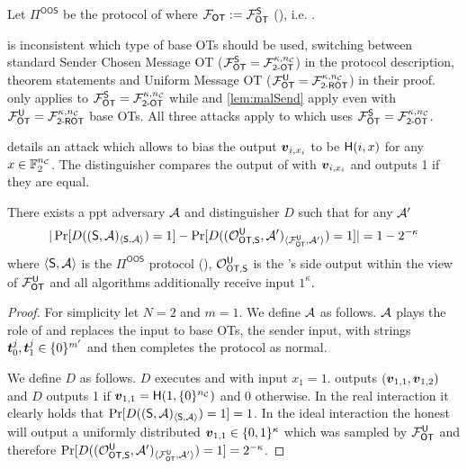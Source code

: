 \begin{definition}\label{def:OOS}
	Let $\Pi^{\textsf{OOS}}$ be the protocol of  where $\OOT:=\OOT^\send$ (), i.e.  \cite[Protocol 2]{RSA:OrrOrsSch17}.
\end{definition}
\begin{remark}\label{remark:oosROT}
	\cite{RSA:OrrOrsSch17} is inconsistent which type of base OTs should be used, switching between standard Sender Chosen Message OT ($\OOT^\send=\mathcal{F}^{\kappa,\nc}_{\textsf{2-OT}}$) in the protocol description, theorem statements and Uniform Message OT ($\OOT^\U=\mathcal{F}^{\kappa,\nc}_{\textsf{2-ROT}}$) in their proof.  only applies to $\OOT^\send=\mathcal{F}^{\kappa,\nc}_{\textsf{2-OT}}$ while  and \ref{lem:malSend} apply even with $\OOT^\U=\mathcal{F}^{\kappa,\nc}_{\textsf{2-ROT}}$ base OTs. All three attacks apply to \cite{C:KelOrsSch15} which uses $\OOT^\send=\mathcal{F}^{\kappa,\nc}_{\textsf{2-OT}}$.
\end{remark}



 details an attack which allows \R to bias the output $\vv_{i,x_i}$ to be $\H(i,x)$ for any $x\in\mathbb{F}^{\nc}_2$. The distinguisher compares the output of \send with $\vv_{i,x_i}$ and outputs 1 if they are equal. 


\begin{lemma} \label{lem:malRec}
	There exists a ppt adversary $\Adv$ and distinguisher $D$ such that for any $\Adv'$ 
	$$
	|\Pr[D((\send, \Adv)_{\langle\send, \Adv\rangle})=1]-\Pr[D((\O^{\U}_{\textsf{OT,\send}}, \Adv')_{\langle\OOT^\U, \Adv'\rangle})=1]|=1-2^{-\kappa}
	$$
	where $\langle\send, \Adv\rangle$ is the $\Pi^{\textsf{OOS}}$ protocol (), $\O^{\U}_{\textsf{OT,\send}}$ is the \send's side output within the view of $\OOT^{\U}$ and all algorithms additionally receive input $1^\kappa$. 
\end{lemma}
\begin{proof}
	For simplicity let $N=2$ and $m=1$. We define $\Adv$ as follows. $\Adv$ plays the role of \rec and replaces the input to base OTs, the sender input, with strings $\tt_0^j,\tt_1^j\in \{0\}^{m'}$ and then completes the protocol as normal.
	
	We define $D$ as follows. $D$ executes \send and \Adv with input $x_1=1$. \send outputs $(\vv_{1,1},\vv_{1,2})$ and $D$ outputs 1 if $\vv_{1,1}=\H(1, \{0\}^\nc)$ and 0 otherwise. In the real interaction it clearly holds that $\Pr[D((\send, \Adv)_{\langle\send, \Adv\rangle})=1]=1$. In the ideal interaction the honest \send will output a uniformly distributed $\vv_{1,1}\in\{0,1\}^\kappa$ which was sampled by $\OOT^{\U}$ and therefore $\Pr[D((\O^{\U}_{\textsf{OT,\send}}, \Adv')_{\langle\OOT^\U, \Adv'\rangle})=1]=2^{-\kappa}$.
\end{proof}



